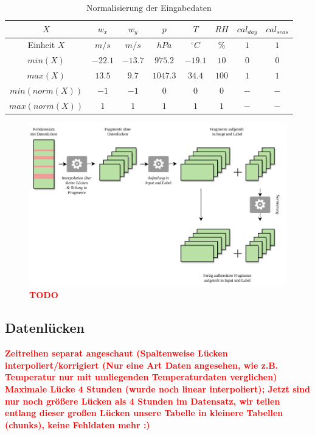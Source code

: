 \documentclass[
12pt, %
toc=listofnumbered, %
toc=chapterentrydotfill, %
numbers=noenddot, %
captions=tableheading, %
]{scrreprt}
\let\Oldsubsection\subsection
\renewcommand{\subsection}{\FloatBarrier\Oldsubsection}
\newcommand{\highlight}[1]{\textbf{\textcolor{red}{#1}}}
\begin{document}
\begin{table}[ht]
	\centering
	\caption{Normalisierung der Eingabedaten}
	\begin{tabular}{|c|c|c|c|c|c|c|c|}
		\hline
		\rowcolor{color80}
		\textbf{$X$} & \textbf{$w_x$} & \textbf{$w_y$} & \textbf{$p$} & \textbf{$T$} & \textbf{$RH$} & \textbf{$cal_{day}$} & \textbf{$cal_{seas}$} \\ \hline
		Einheit $X$ & $m/s$ & $m/s$ & $hPa$ & $^\circ C$ & \% & $1$ & $1$ \\ \hline
		$min(X)$       & $-22.1$ & $-13.7$ & $975.2$ & $-19.1$ & $10$ & $0$ & $0$ \\ \hline
		$max(X)$       & $13.5$ & $9.7$ & $1047.3$ & $34.4$ & $100$ & $1$ & $1$ \\ \hline
		$min(norm(X))$ & $-1$ & $-1$ & $0$ & $0$ & $0$ & $-$ & $-$ \\ \hline
		$max(norm(X))$ & $1$ & $1$ & $1$ & $1$ & $1$ & $-$ & $-$ \\ \hline
	\end{tabular}
\label{tab:normalisierung}
\end{table}

\begin{figure}[tph]
	\begin{center}
		\includegraphics[]{./images/preprocessing.pdf}
		\caption{\highlight{{TODO}}}
		\label{fig:preprocessing}
	\end{center}
\end{figure}

\subsection{Datenlücken}
\highlight{Zeitreihen separat angeschaut (Spaltenweise Lücken interpoliert/korrigiert (Nur eine Art Daten angesehen, wie z.B. Temperatur nur mit umliegenden Temperaturdaten verglichen) 
Maximale Lücke 4 Stunden (wurde noch linear interpoliert); 
Jetzt sind nur noch größere Lücken als 4 Stunden im Datensatz, wir teilen entlang dieser großen Lücken unsere Tabelle in kleinere Tabellen (chunks), keine Fehldaten mehr :)}
\end{document}
